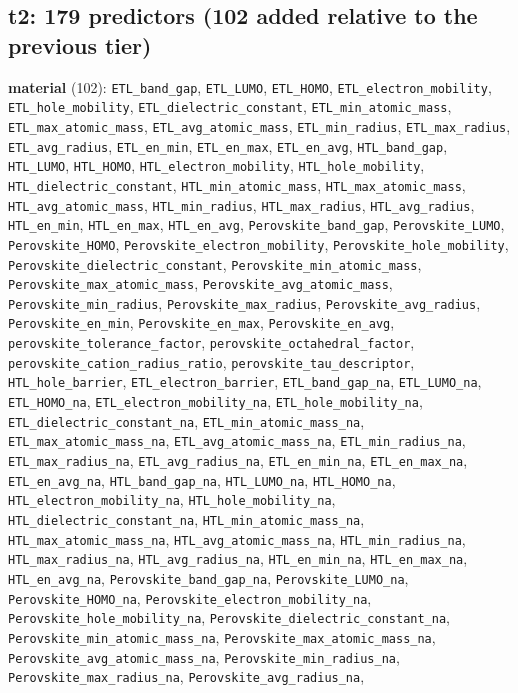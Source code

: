 \documentclass[10pt]{article}
\begin{document}
\subsection*{t2: 179 predictors (102 added relative to the previous tier)}
\textbf{material} (102): \texttt{ETL\_band\_gap}, \texttt{ETL\_LUMO}, \texttt{ETL\_HOMO}, \texttt{ETL\_electron\_mobility}, \texttt{ETL\_hole\_mobility}, \texttt{ETL\_dielectric\_constant}, \texttt{ETL\_min\_atomic\_mass}, \texttt{ETL\_max\_atomic\_mass}, \texttt{ETL\_avg\_atomic\_mass}, \texttt{ETL\_min\_radius}, \texttt{ETL\_max\_radius}, \texttt{ETL\_avg\_radius}, \texttt{ETL\_en\_min}, \texttt{ETL\_en\_max}, \texttt{ETL\_en\_avg}, \texttt{HTL\_band\_gap}, \texttt{HTL\_LUMO}, \texttt{HTL\_HOMO}, \texttt{HTL\_electron\_mobility}, \texttt{HTL\_hole\_mobility}, \texttt{HTL\_dielectric\_constant}, \texttt{HTL\_min\_atomic\_mass}, \texttt{HTL\_max\_atomic\_mass}, \texttt{HTL\_avg\_atomic\_mass}, \texttt{HTL\_min\_radius}, \texttt{HTL\_max\_radius}, \texttt{HTL\_avg\_radius}, \texttt{HTL\_en\_min}, \texttt{HTL\_en\_max}, \texttt{HTL\_en\_avg}, \texttt{Perovskite\_band\_gap}, \texttt{Perovskite\_LUMO}, \texttt{Perovskite\_HOMO}, \texttt{Perovskite\_electron\_mobility}, \texttt{Perovskite\_hole\_mobility}, \texttt{Perovskite\_dielectric\_constant}, \texttt{Perovskite\_min\_atomic\_mass}, \texttt{Perovskite\_max\_atomic\_mass}, \texttt{Perovskite\_avg\_atomic\_mass}, \texttt{Perovskite\_min\_radius}, \texttt{Perovskite\_max\_radius}, \texttt{Perovskite\_avg\_radius}, \texttt{Perovskite\_en\_min}, \texttt{Perovskite\_en\_max}, \texttt{Perovskite\_en\_avg}, \texttt{perovskite\_tolerance\_factor}, \texttt{perovskite\_octahedral\_factor}, \texttt{perovskite\_cation\_radius\_ratio}, \texttt{perovskite\_tau\_descriptor}, \texttt{HTL\_hole\_barrier}, \texttt{ETL\_electron\_barrier}, \texttt{ETL\_band\_gap\_na}, \texttt{ETL\_LUMO\_na}, \texttt{ETL\_HOMO\_na}, \texttt{ETL\_electron\_mobility\_na}, \texttt{ETL\_hole\_mobility\_na}, \texttt{ETL\_dielectric\_constant\_na}, \texttt{ETL\_min\_atomic\_mass\_na}, \texttt{ETL\_max\_atomic\_mass\_na}, \texttt{ETL\_avg\_atomic\_mass\_na}, \texttt{ETL\_min\_radius\_na}, \texttt{ETL\_max\_radius\_na}, \texttt{ETL\_avg\_radius\_na}, \texttt{ETL\_en\_min\_na}, \texttt{ETL\_en\_max\_na}, \texttt{ETL\_en\_avg\_na}, \texttt{HTL\_band\_gap\_na}, \texttt{HTL\_LUMO\_na}, \texttt{HTL\_HOMO\_na}, \texttt{HTL\_electron\_mobility\_na}, \texttt{HTL\_hole\_mobility\_na}, \texttt{HTL\_dielectric\_constant\_na}, \texttt{HTL\_min\_atomic\_mass\_na}, \texttt{HTL\_max\_atomic\_mass\_na}, \texttt{HTL\_avg\_atomic\_mass\_na}, \texttt{HTL\_min\_radius\_na}, \texttt{HTL\_max\_radius\_na}, \texttt{HTL\_avg\_radius\_na}, \texttt{HTL\_en\_min\_na}, \texttt{HTL\_en\_max\_na}, \texttt{HTL\_en\_avg\_na}, \texttt{Perovskite\_band\_gap\_na}, \texttt{Perovskite\_LUMO\_na}, \texttt{Perovskite\_HOMO\_na}, \texttt{Perovskite\_electron\_mobility\_na}, \texttt{Perovskite\_hole\_mobility\_na}, \texttt{Perovskite\_dielectric\_constant\_na}, \texttt{Perovskite\_min\_atomic\_mass\_na}, \texttt{Perovskite\_max\_atomic\_mass\_na}, \texttt{Perovskite\_avg\_atomic\_mass\_na}, \texttt{Perovskite\_min\_radius\_na}, \texttt{Perovskite\_max\_radius\_na}, \texttt{Perovskite\_avg\_radius\_na}, 
\end{document}
